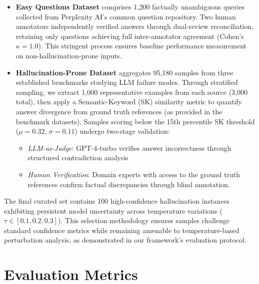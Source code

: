 \documentclass[sigconf]{acmart}
\begin{document}
\begin{itemize}
    \item \textbf{Easy Questions Dataset} comprises 1,200 factually unambiguous queries collected from Perplexity AI's common question repository. Two human annotators independently verified answers through dual-review reconciliation, retaining only questions achieving full inter-annotator agreement (Cohen's $\kappa = 1.0$). This stringent process ensures baseline performance measurement on non-hallucination-prone inputs.

    \item \textbf{Hallucination-Prone Dataset} aggregates 95,180 samples from three established benchmarks \cite{defan_dataset,ignorance_vs_error,halueval} studying LLM failure modes. Through stratified sampling, we extract 1,000 representative examples from each source (3,000 total), then apply a Semantic-Keyword (SK) similarity metric to quantify answer divergence from ground truth references (as provided in the benchmark datasets). Samples scoring below the 15th percentile SK threshold ($\mu = 0.32$, $\sigma = 0.11$) undergo two-stage validation:
    \begin{itemize}
        \item \textit{LLM-as-Judge}: GPT-4-turbo verifies answer incorrectness through structured contradiction analysis
        \item \textit{Human Verification}: Domain experts with access to the ground truth references confirm factual discrepancies through blind annotation.
    \end{itemize}
\end{itemize}

The final curated set contains 100 high-confidence hallucination instances exhibiting persistent model uncertainty across temperature variations ($\tau \in [0.1, 0.2, 0.3]$). This selection methodology ensures samples challenge standard confidence metrics while remaining amenable to temperature-based perturbation analysis, as demonstrated in our framework's evaluation protocol.

\section{Evaluation Metrics}
\end{document}
